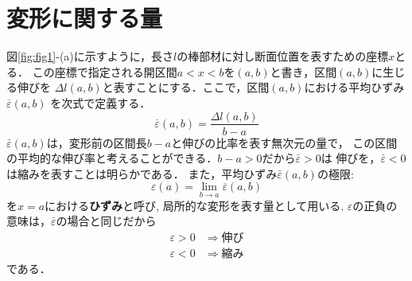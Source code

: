 \documentclass[10pt,a4j]{jbook}
\begin{document}
\section{変形に関する量}
図\ref{fig:fig1}-(a)に示すように，長さ$l$の棒部材に対し断面位置を表すための座標$x$とる．
この座標で指定される開区間$a<x<b$を$(a,b)$と書き，区間$(a,b)$に生じる伸びを
$\Delta l (a,b)$と表すことにする．ここで，区間$(a,b)$における平均ひずみ$\overline{\varepsilon}(a,b)$
を次式で定義する．
\begin{equation}
	\overline{\varepsilon}(a,b) =\frac{\Delta l (a,b)}{b-a}
	\label{eqn:eps_bar}
\end{equation}
$\bar \varepsilon(a,b)$は，変形前の区間長$b-a$と伸びの比率を表す無次元の量で，
この区間の平均的な伸び率と考えることができる．$b-a>0$だから$\bar{\varepsilon}>0$は
伸びを，$\bar{\varepsilon}<0$は縮みを表すことは明らかである．
また，平均ひずみ$\bar{\varepsilon}(a,b)$の極限:
\begin{equation}
	\varepsilon(a)=\lim_{b \rightarrow a}\overline{\varepsilon}(a,b)
	\label{eqn:eps_def}
\end{equation}
を$x=a$における{\rm \bf ひずみ}と呼び, 局所的な変形を表す量として用いる. 
$\varepsilon$の正負の意味は，$\bar\varepsilon$の場合と同じだから
\[
	\begin{array}{cc}
		\varepsilon >0 & \Rightarrow 伸び \\
		\varepsilon <0 & \Rightarrow 縮み
	\end{array}
\]
である．\\
\end{document}

